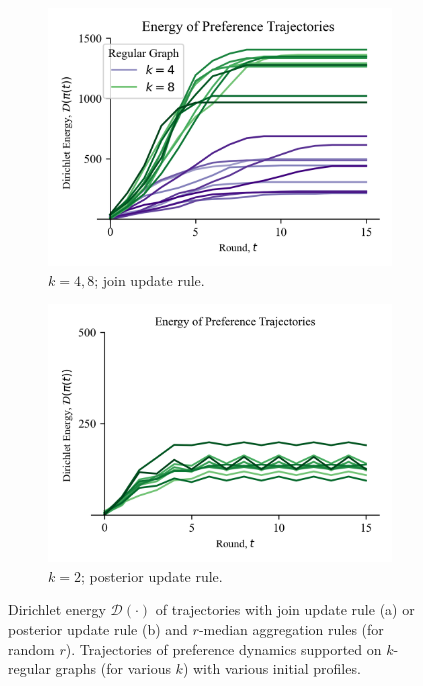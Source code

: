 \documentclass[conference]{ieeeconf}
\newcommand{\D}{\mathcal{D}}
\begin{document}
 \begin{figure}
 \begin{subfigure}[b]{0.5\textwidth}
    \centering
    \includegraphics[width=\textwidth]{code/plots/experiment_2_4_plot.png}
    \caption{$k=4,8$; join update rule.}%
    \label{fig:experiment_2_4}
\end{subfigure}
\begin{subfigure}[b]{0.5\textwidth}
    \centering
    \includegraphics[width=\textwidth]{code/plots/experiment_6_plot.png}
    \caption{$k=2$; posterior update rule.}%
    \label{fig:experiment_5}
\end{subfigure}
\caption{Dirichlet energy $\D(\cdot)$ of trajectories with join update rule (a) or posterior update rule (b) and $r$-median aggregation rules (for random $r$). Trajectories of preference dynamics supported on $k$-regular graphs (for various $k$) with various initial profiles. }
\end{figure}
\end{document}

